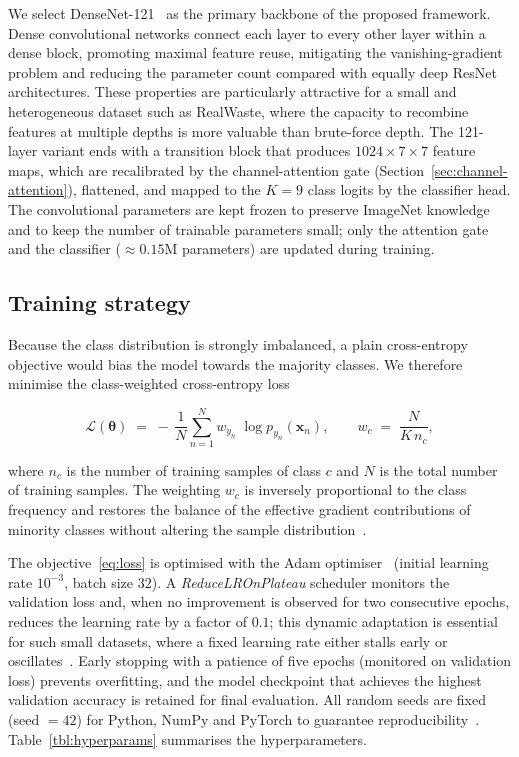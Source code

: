\documentclass[a4paper,fleqn]{cas-dc}
\begin{document}
We select DenseNet-121~\cite{huang_densenet} as the primary backbone of the
proposed framework. Dense convolutional networks connect each layer to every
other layer within a dense block, promoting maximal feature reuse,
mitigating the vanishing-gradient problem and reducing the parameter count
compared with equally deep ResNet architectures. These properties are
particularly attractive for a small and heterogeneous dataset such as
RealWaste, where the capacity to recombine features at multiple depths is
more valuable than brute-force depth. The 121-layer variant ends with a
transition block that produces $1024\times7\times7$ feature maps, which are
recalibrated by the channel-attention gate
(Section~\ref{sec:channel-attention}), flattened, and mapped to the $K=9$
class logits by the classifier head. The convolutional parameters are kept
frozen to preserve ImageNet knowledge and to keep the number of trainable
parameters small; only the attention gate and the classifier
($\approx
0.15$M parameters) are updated during training.

\subsection{Training strategy}\label{sec:training}

Because the class distribution is strongly imbalanced, a plain
cross-entropy objective would bias the model towards the majority classes. We
therefore minimise the class-weighted cross-entropy loss

\begin{equation}\label{eq:loss}
  \mathcal{L}(\boldsymbol\theta) \;=\;
  -\,\frac{1}{N}\sum_{n=1}^{N} w_{y_n}\; \log p_{y_n}(\mathbf{x}_n),
\qquad
  w_c \;=\; \frac{N}{K\, n_c},
\end{equation}

where $n_c$ is the number of training samples of class $c$ and $N$ is the
total number of training samples. The weighting $w_c$ is inversely
proportional to the class frequency and restores the balance of the effective
gradient contributions of minority classes without altering the sample
distribution~\cite{cui_classbalanced}.

The objective~\eqref{eq:loss} is optimised with the Adam
optimiser~\cite{kingma_adam} (initial learning rate $10^{-3}$, batch size
$32$). A \emph{ReduceLROnPlateau} scheduler monitors the validation loss and,
when no improvement is observed for two consecutive epochs, reduces the
learning rate by a factor of $0.1$; this dynamic adaptation is essential for
such small datasets, where a fixed learning rate either stalls early or
oscillates~\cite{goyal_bigbatch}. Early stopping with a patience of five
epochs (monitored on validation loss) prevents overfitting, and the model
checkpoint that achieves the highest validation accuracy is retained for final
evaluation. All random seeds are fixed (seed $=42$) for Python, NumPy and
PyTorch to guarantee reproducibility~\cite{paszke_pytorch}. Table~\ref{tbl:hyperparams}
summarises the hyperparameters.
\end{document}
